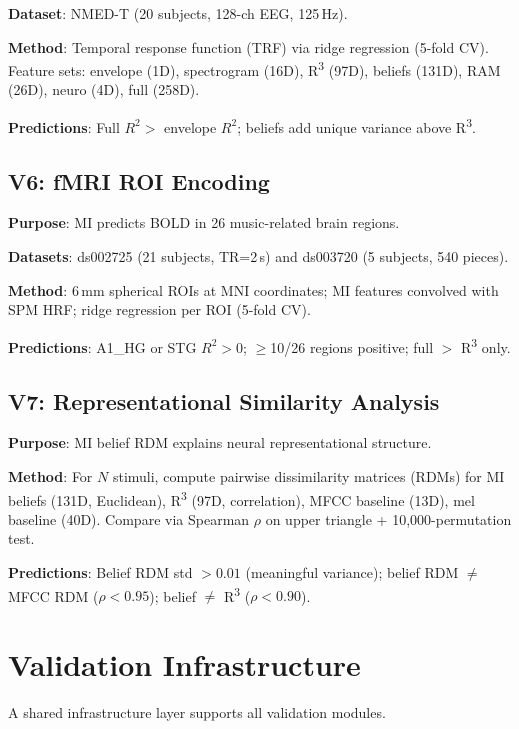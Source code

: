 \documentclass[10pt,twocolumn]{article}
\newcommand{\Rthree}{R\textsuperscript{3}}
\begin{document}
\textbf{Dataset}: NMED-T (20 subjects, 128-ch EEG, 125\,Hz).

\textbf{Method}: Temporal response function (TRF) via ridge regression (5-fold CV). Feature sets: envelope (1D), spectrogram (16D), \Rthree{} (97D), beliefs (131D), RAM (26D), neuro (4D), full (258D).

\textbf{Predictions}: Full $R^2 >$ envelope $R^2$; beliefs add unique variance above \Rthree{}.

\subsection{V6: fMRI ROI Encoding}

\textbf{Purpose}: MI predicts BOLD in 26 music-related brain regions.

\textbf{Datasets}: ds002725 (21 subjects, TR=2\,s) and ds003720 (5 subjects, 540 pieces).

\textbf{Method}: 6\,mm spherical ROIs at MNI coordinates; MI features convolved with SPM HRF; ridge regression per ROI (5-fold CV).

\textbf{Predictions}: A1\_HG or STG $R^2 > 0$; $\geq$10/26 regions positive; full $>$ \Rthree{} only.

\subsection{V7: Representational Similarity Analysis}

\textbf{Purpose}: MI belief RDM explains neural representational structure.

\textbf{Method}: For $N$ stimuli, compute pairwise dissimilarity matrices (RDMs) for MI beliefs (131D, Euclidean), \Rthree{} (97D, correlation), MFCC baseline (13D), mel baseline (40D). Compare via Spearman $\rho$ on upper triangle + 10,000-permutation test.

\textbf{Predictions}: Belief RDM std $> 0.01$ (meaningful variance); belief RDM $\neq$ MFCC RDM ($\rho < 0.95$); belief $\neq$ \Rthree{} ($\rho < 0.90$).

\section{Validation Infrastructure}
\label{sec:infra}

A shared infrastructure layer supports all validation modules.
\end{document}
